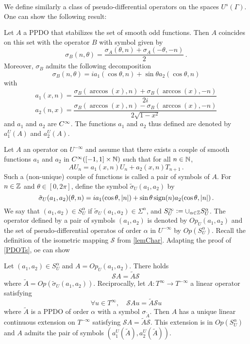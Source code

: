 \documentclass[a4paper]{article}
\begin{document}
We define similarly a class of pseudo-differential operators on the spaces $U^s(\Gamma)$. One can show the following result:
\begin{Lem}
	\label{TransportPPDO_U}
	Let $A$ a PPDO that stabilizes the set of smooth odd functions. Then $A$ coincides on this set with the operator $B$ with symbol given by 
	\[\sigma_B(n,\theta) = \frac{\sigma_A(\theta,n) + \sigma_A(-\theta,-n)}{2}\,.\]
	Moreover, $\sigma_B$ admits the following decomposition
	\[\sigma_B(n,\theta) = i a_1(\cos\theta,n) + \sin\theta a_2(\cos\theta,n)\]
	with
	\[a_1(x,n) = \frac{\sigma_B(\arccos(x),n) + \sigma_B(\arccos(x),-n)}{2i}\]
	\[a_2(n,x) = \frac{\sigma_B(\arccos(x),n) - \sigma_B(\arccos(x),-n)}{2\sqrt{1-x^2}}\] 
	and $a_1$ and $a_2$ are $C^{\infty}$. The functions $a_1$ and $a_2$ thus defined are denoted by $a_1^U(A)$ and $a_2^U(A)$. 
\end{Lem}
Let $A$ an operator on $U^{-\infty}$ and assume that there exists a couple of smooth functions $a_1$ and $a_2$ in $C^{\infty}([-1,1]\times \mathbb{N})$ such that for all $n \in \mathbb{N}$,
\[AU_n = a_1(x,n) U_n + a_2(x,n) T_{n+1}\,.\]
Such a (non-unique) couple of functions is called a pair of symbols of $A$. For $n\in \mathbb{Z}$ and $\theta \in [0,2\pi]$, define the symbol $\tilde{\sigma}_U(a_1,a_2)$ by
\[\tilde{\sigma}_U(a_1,a_2)(\theta,n) = i a_1(\cos\theta,\left\lvert n \right\rvert) + \sin\theta\,\text{sign}(n) a_2(\cos\theta,\left\lvert n \right\rvert)\,.\]
We say that $(a_1,a_2) \in S^\alpha_U$ if $\tilde{\sigma}_U(a_1,a_2) \in \Sigma^\alpha$, and $S^{\infty}_U \mathrel{\mathop:}= \cup_{\alpha \in \mathbb{Z}} S^\alpha_U$. The operator defined by a pair of symbols $(a_1,a_2)$ is denoted by $\textit{Op}_U(a_1,a_2)$ and the set of pseudo-differential operatos of order $\alpha$ in $U^{-\infty}$  by $\textit{Op}(S^\alpha_U)$. 
Recall the definition of the isometric mapping $\mathcal{S}$ from \autoref{lemChar}. Adapting the proof of \autoref{PDOTs}, oe can show
\begin{The}
	\label{PDOUs}
	Let $(a_1,a_2) \in S^\alpha_U$ and $A = \textit{Op}_U(a_1,a_2)$.  There holds
	\[\mathcal{S}A = \tilde{A}\mathcal{S}\,\]
	where $\tilde{A} = \textit{Op}(\tilde{\sigma}_U(a_1,a_2))$. 
	Reciprocally, let $A : T^{\infty} \to T^{-\infty}$ a linear operator satisfying
	\[\forall u \in T^{\infty},\quad \mathcal{S}Au = \tilde{A}\mathcal{S}u\] 
	where $\tilde{A}$ is a PPDO of order $\alpha$ with a symbol $\sigma_{\tilde{A}}$. Then $A$ has a unique linear continuous extension on $T^{-\infty}$ satisfying $\mathcal{S}A = \tilde{A} \mathcal{S}$. This extension is in $\textit{Op}(S^\alpha_U)$ and $A$ admits the pair of symbols $\left(a_1^U(\tilde{A}),a_2^U(\tilde{A})\right)$.
\end{The}
\end{document}
